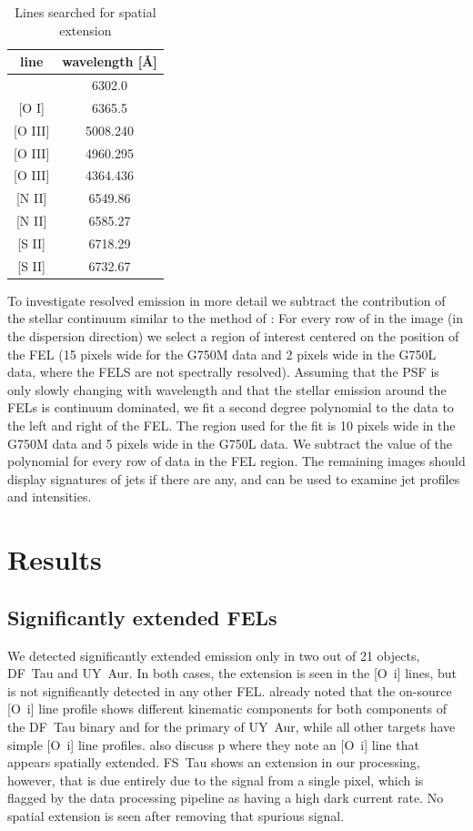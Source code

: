 \documentclass[twocolumn]{aastex62}
\begin{document}
\begin{table}
\caption{{Lines searched for spatial extension\label{tab:searchedlines}}}
\begin{center}
\begin{tabular}{cc}
\hline\hline
line & wavelength [\AA] \\
\hline
[O I] & 6302.0\\{}
[O I] & 6365.5\\{}
[O III] & 5008.240\\{}
[O III] & 4960.295\\{}
[O III] & 4364.436\\{}
[N II] & 6549.86\\{}
[N II] & 6585.27\\{}
[S II] & 6718.29\\{}
[S II] & 6732.67\\
\hline
\end{tabular}
\end{center}
\end{table}


To investigate resolved emission in more detail we subtract the contribution of
the stellar continuum similar to the method of \citet{2013A&A...550L...1S}: For
every row of in the image (in the dispersion direction) we select a region of
interest centered on the position of the FEL (15 pixels wide for the G750M data
and 2 pixels wide in the G750L data, where the FELS are not spectrally
resolved). Assuming that the PSF is only slowly changing with wavelength and
that the stellar emission around the FELs is continuum dominated, we fit a
second degree polynomial to the data to the left and right of the FEL. The
region used for the fit is 10 pixels wide in the G750M data and 5 pixels wide
in the G750L data. We subtract the value of the polynomial for every row of
data in the FEL region. The remaining images should display signatures of jets
if there are any, and can be used to examine jet profiles and intensities. 

\section{Results}
\label{sect:results}

\subsection{Significantly extended FELs}
We detected significantly extended emission only in two out of 21 objects,
DF~Tau and UY~Aur. In both cases, the extension is seen in the [O~{\sc i}]
lines, but is not significantly detected in any other
FEL. \citet{2003ApJ...583..334H} already noted that the on-source [O~{\sc i}]
line profile shows different kinematic components for both components of the
DF~Tau binary and for the primary of UY~Aur, while all other targets have
simple [O~{\sc i}] line profiles. \citet{2003ApJ...583..334H} also discuss
 p where they note an [O~{\sc i}] line that appears spatially
extended. FS~Tau shows an extension in our processing, however, that is due
entirely due to the signal from a single pixel, which is flagged by the data
processing pipeline as having a high dark current rate. No spatial extension is seen after removing that spurious signal.
\end{document}
